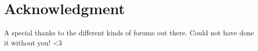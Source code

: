\section*{Acknowledgment}
A special thanks to the different kinds of forums out there. Could not have done it without you! <3